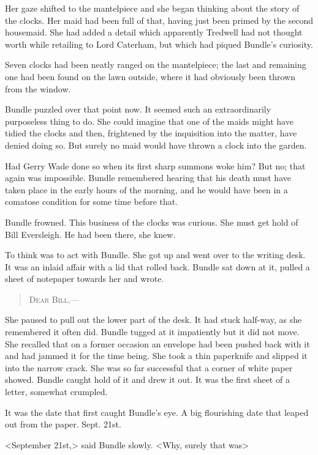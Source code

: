 Her gaze shifted to the mantelpiece and she began thinking about the story of the clocks. Her maid had been full of that, having just been primed by the second housemaid. She had added a detail which apparently Tredwell had not thought worth while retailing to Lord Caterham, but which had piqued Bundle's curiosity.

Seven clocks had been neatly ranged on the mantelpiece; the last and remaining one had been found on the lawn outside, where it had obviously been thrown from the window.

Bundle puzzled over that point now. It seemed such an extraordinarily purposeless thing to do. She could imagine that one of the maids might have tidied the clocks and then, frightened by the inquisition into the matter, have denied doing so. But surely no maid would have thrown a clock into the garden.

Had Gerry Wade done so when its first sharp summons woke him? But no; that again was impossible. Bundle remembered hearing that his death must have taken place in the early hours of the morning, and he would have been in a comatose condition for some time before that.

Bundle frowned. This business of the clocks was curious. She must get hold of Bill Eversleigh. He had been there, she knew.

To think was to act with Bundle. She got up and went over to the writing desk. It was an inlaid affair with a lid that rolled back. Bundle sat down at it, pulled a sheet of notepaper towards her and wrote.

\begin{quote}\scshape
Dear Bill,— 
\end{quote}

She paused to pull out the lower part of the desk. It had stuck half-way, as she remembered it often did. Bundle tugged at it impatiently but it did not move. She recalled that on a former occasion an envelope had been pushed back with it and had jammed it for the time being. She took a thin paperknife and slipped it into the narrow crack. She was so far successful that a corner of white paper showed. Bundle caught hold of it and drew it out. It was the first sheet of a letter, somewhat crumpled.

It was the date that first caught Bundle's eye. A big flourishing date that leaped out from the paper. Sept. 21st.

<September 21st,> said Bundle slowly. <Why, surely that was\longdash>

